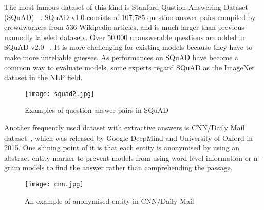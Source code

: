 The most famous dataset of this kind is Stanford Qustion Answering Dataset (SQuAD) ~\cite{rajpurkar2016squad}. SQuAD v1.0 consists of 107,785 question-answer pairs compiled by crowdworkers from 536 Wikipedia articles, and is much larger than previous manually labeled datasets. Over 50,000 unanswerable questions are added in SQuAD v2.0 ~\cite{rajpurkar2018know}. It is more challenging for existing models because they have to make more unreliable guesses. As performances on SQuAD have become a common way to evaluate models, some experts regard SQuAD as the ImageNet~\cite{Deng2009ImageNet} dataset in the NLP field. 

\begin{figure}[!t]                                                     %
\centering                                                                %
\texttt{[image: squad2.jpg]}                                    %
\caption{Examples of question-answer pairs in SQuAD}                                    %
\end{figure}

\begin{comment}
\begin{figure}[!t]                                                     %
\centering                                                                %
\texttt{[image: squad1.jpg]}                                    %
\caption{SQuAD compared to other datasets}                                    %
\end{figure}
\end{comment}

Another frequently used dataset with extractive answers is CNN/Daily Mail dataset~\cite{Hermann2015Teaching}, which was released by Google DeepMind and University of Oxford in 2015. One shining point of it is that each entity is anonymised by using an abstract entity marker to prevent models from using word-level information or n-gram models to find the answer rather than comprehending the passage.

\begin{figure}[!t]                                                     %
\centering                                                                %
\texttt{[image: cnn.jpg]}                                    %
\caption{An example of anonymised entity in CNN/Daily Mail}                                    %
\end{figure}


